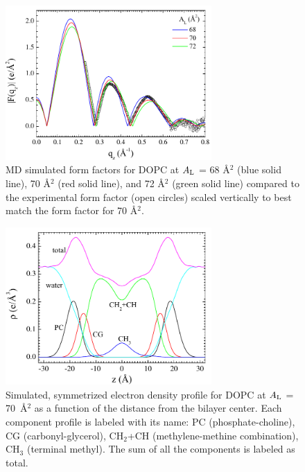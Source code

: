 \begin{figure}[p]
  \centering
  \includegraphics[width=0.7\textwidth]{figures/Tat/MD_Results/xff/dopc_sim-exp}
  \caption[MD simulated form factors for DOPC at $\AL$ = 68 \AA$^2$ (blue solid line), 
  70 \AA$^2$ (red solid line), and 72 \AA$^2$ (green solid line)
  compared to the experimental form factor (open circles) scaled vertically
  to best match the form factor for 70 \AA$^2$]
  {MD simulated form factors for DOPC at $\AL$ = 68 \AA$^2$ (blue solid line), 
  70 \AA$^2$ (red solid line), and 72 \AA$^2$ (green solid line)
  compared to the experimental form factor (open circles) scaled vertically
  to best match the form factor for 70 \AA$^2$.}
  \label{fig:MD_dopc_sim-exp}
\end{figure}

\begin{figure}[p]
  \centering
  \includegraphics[width=0.7\textwidth]{figures/Tat/MD_Results/edp/dopc_70_PC-CG}
  \caption[Simulated, symmetrized electron density profile for DOPC at 
  $\AL$ = 70~\AA$^2$ as a function of the distance from the bilayer center]
  {Simulated, symmetrized electron density profile for DOPC at 
  $\AL$ = 70~\AA$^2$ as a function of the distance from the bilayer center. 
  Each component profile is labeled with its name: PC (phosphate-choline),
  CG (carbonyl-glycerol), CH$_2$+CH (methylene-methine combination), 
  CH$_3$ (terminal methyl). The sum of all the components is labeled as total.}
  \label{fig:MD_dopc_70_PC-CG}
\end{figure}

